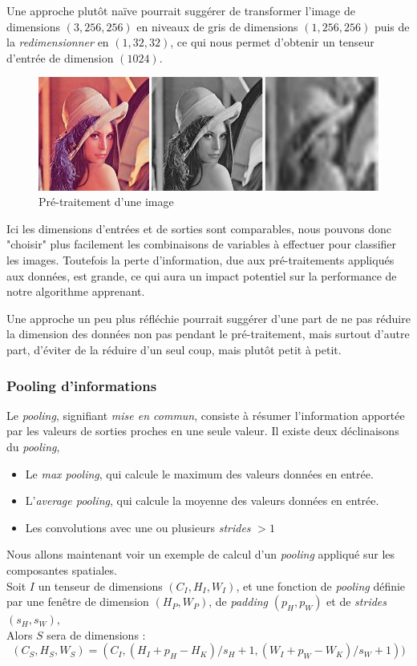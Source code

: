\documentclass[a4paper, 10pt]{report}
\begin{document}
Une approche plutôt naïve pourrait suggérer de transformer l'image de dimensions $(3, 256, 256)$ en niveaux de gris de dimensions $(1, 256, 256)$ puis de la \emph{redimensionner} en $(1, 32, 32)$, ce qui nous permet d'obtenir un tenseur d'entrée de dimension $(1024)$.
\begin{figure}[H]
	\begin{center}
		\includegraphics[scale=0.25]{Images/Lena.jpg}
		\caption{Pré-traitement d'une image}
	\end{center}
\end{figure}
Ici les dimensions d'entrées et de sorties sont comparables, nous pouvons donc "choisir" plus facilement les combinaisons de variables à effectuer pour classifier les images. Toutefois la perte d'information, due aux pré-traitements appliqués aux données, est grande, ce qui aura un impact potentiel sur la performance de notre algorithme apprenant.

Une approche un peu plus réfléchie pourrait suggérer d'une part de ne pas réduire la dimension des données non pas pendant le pré-traitement, mais surtout d'autre part, d'éviter de la réduire d'un seul coup, mais plutôt petit à petit.

\subsubsection{Pooling d'informations}
Le \emph{pooling}, signifiant \emph{mise en commun}, consiste à résumer l'information apportée par les valeurs de sorties proches en une seule valeur.
Il existe deux déclinaisons du \emph{pooling},
\begin{itemize}
	\item Le \emph{max pooling}, qui calcule le maximum des valeurs données en entrée.
	\item L'\emph{average pooling}, qui calcule la moyenne des valeurs données en entrée.
	\item Les convolutions avec une ou plusieurs \emph{strides} $> 1$
\end{itemize}
Nous allons maintenant voir un exemple de calcul d'un \emph{pooling} appliqué sur les composantes spatiales.\\
Soit $I$ un tenseur de dimensions $(C_I, H_I, W_I)$, et une fonction de \emph{pooling} définie par une fenêtre de dimension $(H_P, W_P)$, de \emph{padding} $(p_H, p_W)$ et de \emph{strides} $(s_H, s_W)$,\\
Alors $S$ sera de dimensions :
$$(C_S, H_S, W_S) = (C_I, (H_I + p_H - H_K) / s_H + 1, (W_I + p_W - W_K) / s_W + 1))$$
\end{document}
